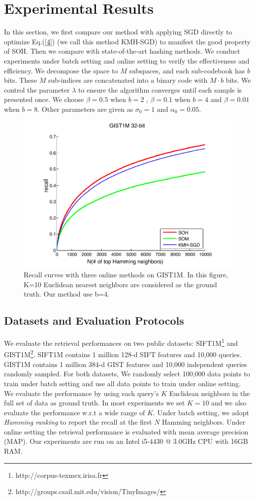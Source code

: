 \documentclass{article}
\begin{document}
\section{Experimental Results}
In this section, we first compare our method with applying SGD directly to optimize Eq.(\ref{4}) (we call this method KMH-SGD) to manifest the good property of SOH. Then we compare with state-of-the-art hashing methods. We conduct experiments under batch setting and online setting to verify the effectiveness and efficiency. We decompose the space to $M$ subspaces, and each sub-codebook has $b$ bits. These $M$ sub-indices are concatenated into a binary code with $M\cdot b$ bits. We control the parameter $\lambda$ to ensure the algorithm converges until each sample is presented once.
We choose $\beta = 0.5$ when $b=2$ , $\beta = 0.1$ when $b=4$ and $\beta = 0.01$ when $b=8$. Other parameters are given as $\sigma_{0} = 1$ and $\alpha_{0} = 0.05$.
\begin{figure}[t]
	\begin{center}
		\includegraphics[width=0.76\columnwidth]{online_compare_p}
		\caption{Recall curves with three online methods on GIST1M. In this figure, K=10 Euclidean nearest neighbors are considered as the ground truth. Our method use b=4. }
		\label{somkmeans}
	\end{center}
\end{figure}
\subsection{Datasets and Evaluation Protocols}
We evaluate the retrieval performances on two public datasets: SIFT1M\footnote{http://corpus-texmex.irisa.fr} and GIST1M\footnote{http://groups.csail.mit.edu/vision/TinyImages/}.
SIFT1M contains 1 million 128-d SIFT features \cite{lowe2004distinctive} and 10,000  queries. GIST1M contains 1 million 384-d GIST features \cite{oliva2001modeling} and 10,000 independent queries randomly sampled.
For both datasets, We randomly select 100,000 data points to train under batch setting and use all data points to train under online setting.
We evaluate the performance by using each query's $K$ Euclidean neighbors in the full set of data as ground truth. In most experiments we set $K=10$ and we also evaluate the performance w.r.t a wide range of $K$. Under batch setting, we adopt \emph{Hamming ranking} to report the recall at the first $N$ Hamming neighbors. Under online setting the retrieval performance is evaluated with mean average precision (MAP). Our experiments are run on an Intel i5-4430 @ 3.0GHz CPU with 16GB RAM.
\end{document}
